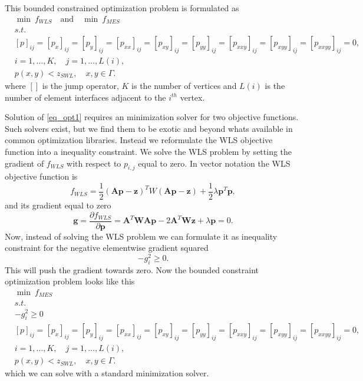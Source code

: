 \documentclass[A4paper,11pt]{marine_2023_Paper}
\newcommand{\V}[1]{\boldsymbol{#1}}
\newcommand{\M}[1]{\mathbf{#1}}
\newcommand{\nn}{\nonumber}
\newcommand{\D}[2]{\frac{\partial #1}{\partial #2}}
\begin{document}
This bounded constrained optimization problem is formulated as 
\begin{align}
	&\min~f_{WLS} \quad \mathrm{and} \quad \min ~f_{MES} \nn \\
	&s.t. \nn	\\
	&[p]_{ij} =[p_x]_{ij}=[p_y]_{ij}=[p_{xx}]_{ij}=[p_{xy}]_{ij}=[p_{yy}]_{ij}=[p_{xxy}]_{ij}=[p_{xyy}]_{ij}=[p_{xxyy}]_{ij}=0, \nn \\
	& i=1,\ldots,K, \quad j=1,\ldots,L(i), \nn \\
	& 	p(x,y)< z_{SWL}, \quad x,y \in \Gamma.
	\label{eq_opt1}
\end{align}
where $[]$ is the jump operator, $K$ is the number of vertices and $L(i)$ is the number of element interfaces adjacent to the $i^{th}$ vertex. 

Solution of \eqref{eq_opt1} requires an minimization solver for two objective functions. Such solvers exist, but we find them to be exotic and beyond whats available in common optimization libraries. Instead we reformulate the WLS objective function into a inequality constraint. We solve the WLS problem by setting the gradient of $f_{WLS}$ with respect to $p_{i,j}$ equal to zero. In vector notation the WLS objective function is 
\begin{equation}
f_{WLS} = \frac{1}{2} (\M{A}\V{p}-\V{z})^T W (\M{A}\V{p}-\V{z}) + \frac{1}{2} \lambda \V{p}^T\V{p},
\end{equation}
and its gradient equal to zero
\begin{equation}
\V{g} = \D{f_{WLS}}{\V{p}} = \M{A}^T\M{W}\M{A}\V{p} - 2\M{A}^T\M{W}\V{z} + \lambda \V{p} = 0.
\end{equation}
Now, instead of solving the WLS problem we can formulate it as inequality constraint for the negative elementwise gradient squared
\begin{equation}
	- g_i^2 \geq 0.
\end{equation}
This will push the gradient towards zero. Now the bounded constraint optimization problem looks like this
\begin{align}
	&\min ~f_{MES} \nn \\
	&s.t. \nn	\\
	& - g_i^2 \geq 0 \nn \\
	&[p]_{ij} =[p_x]_{ij}=[p_y]_{ij}=[p_{xx}]_{ij}=[p_{xy}]_{ij}=[p_{yy}]_{ij}=[p_{xxy}]_{ij}=[p_{xyy}]_{ij}=[p_{xxyy}]_{ij}=0, \nn \\
	& i=1,\ldots,K, \quad j=1,\ldots,L(i), \nn \\
	& 	p(x,y)< z_{SWL}, \quad x,y \in \Gamma.
	\label{eq_opt1}
\end{align}
which we can solve with a standard minimization solver.
\end{document}
